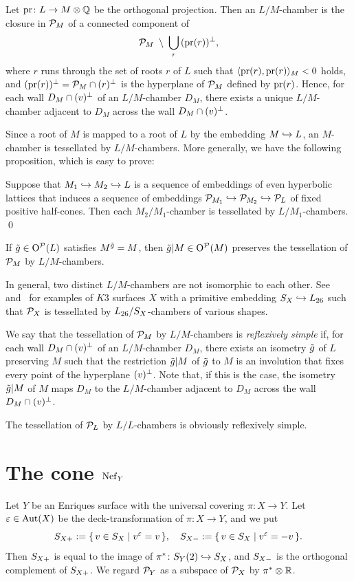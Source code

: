 \documentclass{amsart}
\numberwithin{procedure}{section}
\begin{document}
%
%
Let $\mathord{\mathrm{pr}}\colon L\to M\otimes \mathord{\mathbb Q}$ be the orthogonal projection.
Then an $L/M$-chamber is the closure in $\mathord{\mathcal P}_M$
of a connected component of
\[
\mathord{\mathcal P}_M\;\setminus\; \bigcup_r \,(\mathord{\mathrm{pr}}(r))\sp{\perp},
\]
where $r$ runs through the set
of  roots $r$ of $L$ such that $\langle \mathord{\mathrm{pr}}(r), \mathord{\mathrm{pr}}(r) \rangle_M<0$ holds, 
and $(\mathord{\mathrm{pr}}(r))\sp{\perp}=\mathord{\mathcal P}_M\cap (r)\sp{\perp}$ is the hyperplane of $\mathord{\mathcal P}_M$ defined by
$\mathord{\mathrm{pr}}(r)$.
Hence, for each wall $D_M\cap(v)\sp{\perp}$ of an  $L/M$-chamber $D_M$,
there exists a unique $L/M$-chamber adjacent to $D_M$
across the wall $D_M\cap(v)\sp{\perp}$.
%
\par
%
Since a root of $M$ is mapped to a root of $L$ by the embedding $M\hookrightarrow L$,
an $M$-chamber
is tessellated by $L/M$-chambers.
More generally, we have the following proposition, which is easy to prove:
%
\begin{proposition}\label{prop:LM1M2}
Suppose that  $M_1 \hookrightarrow M_2 \hookrightarrow  L$
is a sequence of embeddings of even hyperbolic lattices
that induces a sequence of embeddings
$\mathord{\mathcal P}_{M_1}\hookrightarrow \mathord{\mathcal P}_{M_2} \hookrightarrow \mathord{\mathcal P}_{L}$
of  fixed positive half-cones.
Then
each $M_2/M_1$-chamber
is tessellated by $L/M_1$-chambers.
\qed
\end{proposition}
%
If $\tilde{g}\in \mathord{\mathrm{O}}^{\mathord{\mathcal P}}(L)$ satisfies $M^{\tilde{g}}=M$, then
$\tilde{g}|M\in \mathord{\mathrm{O}}^{\mathord{\mathcal P}}(M)$ preserves the tessellation of $\mathord{\mathcal P}_M$ by $L/M$-chambers.
\par
In general,
two distinct  $L/M$-chambers are not isomorphic to each other.
See~\cite{KKS2014} and~\cite{Shimada2015} for examples of $K3$ surfaces $X$ 
with a primitive embedding $S_{X}\hookrightarrow L_{26}$ 
such that  $\mathord{\mathcal P}_X$ 
is tessellated by $L_{26}/S_{X}$-chambers of various shapes.
%
\begin{definition}\label{def:reflexively}
We say that the tessellation of $\mathord{\mathcal P}_M$ by $L/M$-chambers is
\emph{reflexively simple}
if, for  each wall  $D_M\cap(v)\sp{\perp}$ of an $L/M$-chamber $D_M$,
there exists an isometry $\tilde{g}$ of $L$ preserving $M$ 
such that the restriction $\tilde{g} |M$ of $\tilde{g}$ to $M$ is an involution that  fixes 
every point of 
the hyperplane $(v)\sp{\perp}$.
Note that, if this is the case,
the isometry $\tilde{g} |M$ of $M$ 
 maps $D_M$ to 
the $L/M$-chamber adjacent to $D_M$ across the wall $D_M\cap(v)\sp{\perp}$.
\end{definition}
%
The tessellation of $\mathord{\mathcal P}_L$ by $L/L$-chambers is
obviously reflexively simple.
%
%
%
\section{The cone $\mathord{\rm Nef}_{Y}$}\label{sec:nefY} 
%
Let $Y$ be an Enriques surface
with the universal covering $\pi\colon X\to Y$.
Let $\varepsilon\in \operatorname{\mathrm{Aut}}\nolimits(X)$ be the deck-transformation of $\pi\colon X\to Y$, 
and we put
\[
S_{X+}:=\{\,{v\in S_{X}}\mid {v^\varepsilon=v} \,\}, \quad
S_{X-}:=\{\,{v\in S_{X}}\mid {v^\varepsilon=-v} \,\}.
\]
Then 
$S_{X+}$  is equal to the image of $\pi^*\colon S_{Y}(2)\hookrightarrow S_{X}$,
and  $S_{X-}$  is  the orthogonal complement 
of $S_{X+}$.
We regard $\mathord{\mathcal P}_Y$ as a subspace of $\mathord{\mathcal P}_X$ by $\pi^*\otimes\mathord{\mathbb R}$.
%
\end{document}
